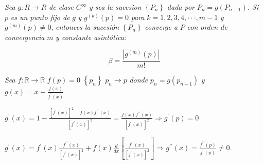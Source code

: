 \documentclass{article}
\begin{document}
\textit{Sea} $g:R\rightarrow R$ \textit{de clase} $C^{\infty }$ \textit{y
sea la sucesion} $\left\{ P_{n}\right\} $ \textit{dada por} $%
P_{n}=g(P_{n-1}) $\textit{. Si} $p$ \textit{es un punto fijo de }$g$ \textit{%
y} $g^{(k)}(p)=0$ \textit{para} $k=1,2,3,4,\cdot \cdot \cdot ,m-1$ \textit{y}
$g^{(m)}(p)\neq 0 $, \textit{entonces la sucesi\'{o}n} $\left\{
P_{n}\right\} $ \textit{converge a }$P$ \textit{con orden de convergencia }$m
$ \textit{y constante asint\'{o}tica:}

\[
\beta =\frac{\left\vert g^{(m)}(p)\right\vert }{m!} 
\]

\textit{Sea }$f:%
\mathbb{R}
\rightarrow 
\mathbb{R}
$ $f(p)=0$ $\left\{ p_{n}\right\} $ $p_{n}\rightarrow p$ \textit{donde }$%
p_{n}=g(p_{n-1})$ \textit{y }$g(x)=x-\frac{f(x)}{f^{\prime }(x)}$


$g^{\prime }(x)=1-\frac{\left[ f^{\prime }(x)\right] ^{2}-f(x)f^{\prime
\prime }(x)}{\left[ f^{\prime }(x)\right] ^{2}}=\frac{f(x)f^{\prime \prime
}(x)}{\left[ f^{\prime }(x)\right] ^{2}}\Longrightarrow g^{\prime }(p)=0$

$g^{\prime }(x)=f^{\prime }(x)\frac{f^{\prime \prime }(x)}{\left[ f^{\prime
}(x)\right] ^{2}}+f(x)\frac{d}{dx}\left[ \frac{f^{\prime \prime }(x)}{\left[
f^{\prime }(x)\right] ^{2}}\right] \Longrightarrow g^{\prime \prime }(x)=%
\frac{f^{\prime \prime }(p)}{f^{\prime }(p)}\neq 0.$


\bigskip 
\end{document}
